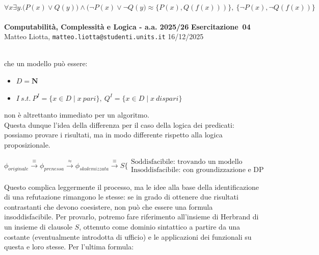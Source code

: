 \documentclass[a4paper,10pt]{article}
\makeatletter
\newcommand{\DocType}{Esercitazione} %
\newcommand{\FullTitle}{\DocType\ \EsercitazioneNum}
\newcommand{\Header}{
\noindent
  \small \textbf{Computabilità, Complessità e Logica - a.a. 2025/26} \hfill \textbf{\FullTitle} \\[0.2cm]
  \scriptsize Matteo Liotta, \texttt{matteo.liotta@studenti.units.it} \hfill \Data \\[0.2cm]
  \noindent\makebox[\linewidth]{\rule{\linewidth}{0.4pt}} \\[0.3cm]}
\newcommand{\NewPageHeader}{
  \vfill
  \noindent\makebox[\linewidth]{\rule{\linewidth}{0.4pt}}
  \newpage
  {\Header}
}
\newcommand{\EsercitazioneNum}{04}
\newcommand{\Data}{16/12/2025}
\makeatother
\begin{document}
$$\forall x\exists y. \bigg(P(x)\lor Q(y)\bigg) \land\bigg(\lnot P(x)\lor \lnot Q(y\bigg)\approx\{P(x),Q(f(x)))\},\ \{\lnot P(x),\lnot Q(f(x))\}$$\\
\NewPageHeader
che un modello può essere:
\begin{itemize}
    \item $D=\mathbf{N}$
    \item $I\ s.t.\ P^I =\{x\in D\mid x\  pari\},\ Q^I =\{x\in D\mid x\  dispari\}$
\end{itemize}
non è altrettanto immediato per un algoritmo.\\

Questa dunque l'idea della differenza per il caso della logica dei predicati: possiamo provare i risultati, ma in modo differente rispetto alla logica proposizionale.

$$\phi_{originale}\overset{\equiv}{\longrightarrow} \phi_{prenessa} \overset{\approx}{\longrightarrow}
\phi_{skolemizzata}\overset{\equiv}{\longrightarrow}S
\bigg\{
\begin{array}{cc}
    \text{Soddisfacibile: trovando un modello} &  \\
    \text{Insoddisfacibile: con groundizzazione e DP} & 
\end{array}$$

Questo complica leggermente il processo, ma le idee alla base della identificazione di una refutazione rimangono le stesse: se in grado di ottenere due risultati contrastanti che devono coesistere, non può che essere una formula insoddisfacibile. Per provarlo, potremo fare riferimento all'insieme di Herbrand di un insieme di clausole $S$, ottenuto come dominio sintattico a partire da una costante (eventualmente introdotta di ufficio) e le applicazioni dei funzionali su questa e loro stesse. 
Per l'ultima formula:
\end{document}
